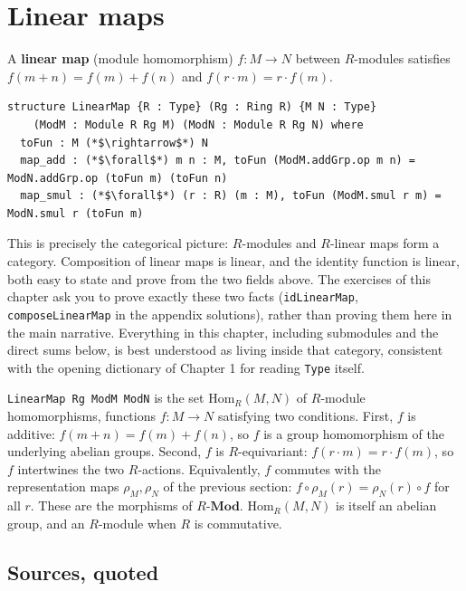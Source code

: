 \section{Linear maps}\label{sec:11-modules:05-linear-maps:1}

A \textbf{linear map} (module homomorphism) \(f : M \to N\) between \(R\)-modules satisfies \(f(m+n) = f(m) + f(n)\) and \(f(r \cdot m) = r \cdot f(m)\).

\begin{lstlisting}
structure LinearMap {R : Type} (Rg : Ring R) {M N : Type}
    (ModM : Module R Rg M) (ModN : Module R Rg N) where
  toFun : M (*$\rightarrow$*) N
  map_add : (*$\forall$*) m n : M, toFun (ModM.addGrp.op m n) = ModN.addGrp.op (toFun m) (toFun n)
  map_smul : (*$\forall$*) (r : R) (m : M), toFun (ModM.smul r m) = ModN.smul r (toFun m)
\end{lstlisting}

This is precisely the categorical picture: \(R\)-modules and \(R\)-linear maps form a category. Composition of linear maps is linear, and the identity function is linear, both easy to state and prove from the two fields above. The exercises of this chapter ask you to prove exactly these two facts (\texttt{idLinearMap}, \texttt{composeLinearMap} in the appendix solutions), rather than proving them here in the main narrative. Everything in this chapter, including submodules and the direct sums below, is best understood as living inside that category, consistent with the opening dictionary of Chapter 1 for reading \texttt{Type} itself.

\begin{mathreading}

\texttt{LinearMap Rg ModM ModN} is the set \(\mathrm{Hom}_R(M, N)\) of \(R\)-module homomorphisms, functions \(f : M \to N\) satisfying two conditions. First, \(f\) is additive: \(f(m+n) = f(m)+f(n)\), so \(f\) is a group homomorphism of the underlying abelian groups. Second, \(f\) is \(R\)-equivariant: \(f(r\cdot m) = r\cdot f(m)\), so \(f\) intertwines the two \(R\)-actions. Equivalently, \(f\) commutes with the representation maps \(\rho_M, \rho_N\) of the previous section: \(f\circ\rho_M(r) =
\rho_N(r)\circ f\) for all \(r\). These are the morphisms of \(R\text{-}\mathbf{Mod}\). \(\mathrm{Hom}_R(M,N)\) is itself an abelian group, and an \(R\)-module when \(R\) is commutative.

\end{mathreading}

\subsection{Sources, quoted}\label{sec:11-modules:05-linear-maps:2}

